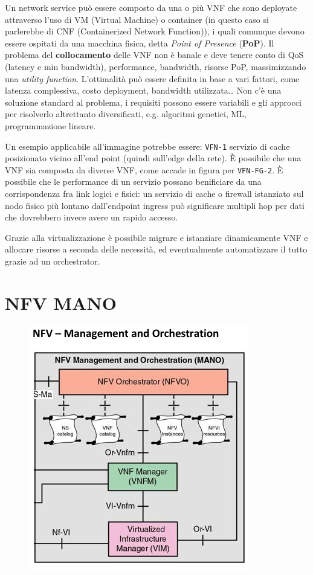 Un network service può essere composto da una o più VNF che sono deployate attraverso l'uso di VM (Virtual Machine) o container (in questo caso si parlerebbe di CNF (Containerized Network Function)), i quali comunque devono essere ospitati da una macchina fisica, detta \textit{Point of Presence} (\textbf{PoP}).
Il problema del \textbf{collocamento} delle VNF non è banale e deve tenere conto di QoS (latency e min bandwidth), performance, bandwidth, risorse PoP, massimizzando una \textit{utility function}.
L'ottimalità può essere definita in base a vari fattori, come latenza complessiva, costo deployment, bandwidth utilizzata\dots
Non c'è una soluzione standard al problema, i requisiti possono essere variabili e gli approcci per risolverlo altrettanto diversificati, e.g. algoritmi genetici, ML, programmazione lineare.

Un esempio applicabile all'immagine potrebbe essere: \texttt{VFN-1} servizio di cache posizionato vicino all'end point (quindi sull'edge della rete). È possibile che una VNF sia composta da diverse VNF, come accade in figura per \texttt{VFN-FG-2}.
È possibile che le performance di un servizio possano benificiare da una corrispondenza fra link logici e fisici: un servizio di cache o firewall istanziato sul nodo fisico più lontano  dall'endpoint ingress può significare multipli hop per dati che dovrebbero invece avere un rapido accesso.

Grazie alla virtualizzazione è possibile migrare e istanziare dinamicamente VNF e allocare risorse a seconda delle necessità, ed eventualmente automatizzare il tutto grazie ad un orchestrator. 


\section{NFV MANO}

\begin{figure}[htbp]
   \centering
   \includegraphics{images/questions/Schermata del 2023-11-03 12-20-29.png}
   \label{fig:dom2.13}
\end{figure}

